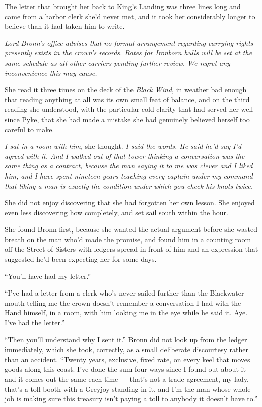 The letter that brought her back to King’s Landing was three lines long and came from a harbor clerk she’d never met, and it took her considerably longer to believe than it had taken him to write.

\textit{Lord Bronn’s office advises that no formal arrangement regarding carrying rights presently exists in the crown’s records. Rates for Ironborn hulls will be set at the same schedule as all other carriers pending further review. We regret any inconvenience this may cause.}

She read it three times on the deck of the \textit{Black Wind}, in weather bad enough that reading anything at all was its own small feat of balance, and on the third reading she understood, with the particular cold clarity that had served her well since Pyke, that she had made a mistake she had genuinely believed herself too careful to make.

\textit{I sat in a room with him,} she thought. \textit{I said the words. He said he’d say I’d agreed with it. And I walked out of that tower thinking a conversation was the same thing as a contract, because the man saying it to me was clever and I liked him, and I have spent nineteen years teaching every captain under my command that liking a man is exactly the condition under which you check his knots twice.}

She did not enjoy discovering that she had forgotten her own lesson. She enjoyed even less discovering how completely, and set sail south within the hour.

\sceneBreak

She found Bronn first, because she wanted the actual argument before she wasted breath on the man who’d made the promise, and found him in a counting room off the Street of Sisters with ledgers spread in front of him and an expression that suggested he’d been expecting her for some days.

“You’ll have had my letter.”

“I’ve had a letter from a clerk who’s never sailed further than the Blackwater mouth telling me the crown doesn’t remember a conversation I had with the Hand himself, in a room, with him looking me in the eye while he said it. Aye. I’ve had the letter.”

“Then you’ll understand why I sent it.” Bronn did not look up from the ledger immediately, which she took, correctly, as a small deliberate discourtesy rather than an accident. “Twenty years, exclusive, fixed rate, on every keel that moves goods along this coast. I’ve done the sum four ways since I found out about it and it comes out the same each time — that’s not a trade agreement, my lady, that’s a toll booth with a Greyjoy standing in it, and I’m the man whose whole job is making sure this treasury isn’t paying a toll to anybody it doesn’t have to.”

